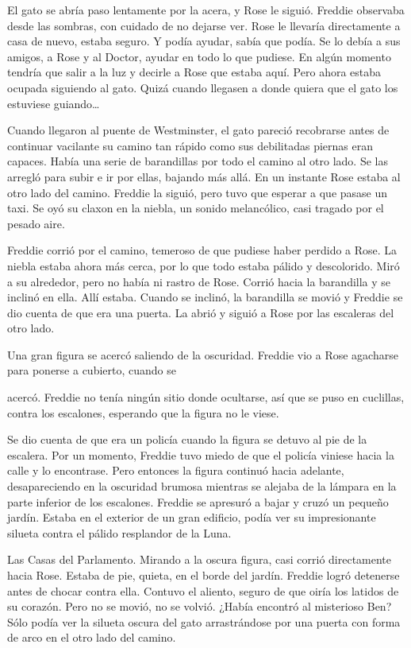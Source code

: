 \mbox{}

{El gato se abría paso lentamente por la acera, y Rose le siguió.
	Freddie observaba desde las sombras, con cuidado de no dejarse ver. Rose
	le llevaría directamente a casa de nuevo, estaba seguro. Y podía ayudar,
	sabía que podía. Se lo debía a sus amigos, a Rose y al Doctor, ayudar en
	todo lo que pudiese. En algún momento tendría que salir a la luz y
	decirle a Rose que estaba aquí. Pero ahora estaba ocupada siguiendo al
	gato. Quizá cuando llegasen a donde quiera que el gato los estuviese
	guiando\ldots{}}

{Cuando llegaron al puente de Westminster, el gato pareció recobrarse
	antes de continuar vacilante su camino tan rápido como sus debilitadas
	piernas eran capaces. Había una serie de barandillas por todo el camino
	al otro lado. Se las arregló para subir e ir por ellas, bajando más
	allá. En un instante Rose estaba al otro lado del camino. Freddie la
	siguió, pero tuvo que esperar a que pasase un taxi. Se oyó su claxon en
la niebla, un sonido melancólico, casi tragado por el pesado aire.}

{Freddie corrió por el camino, temeroso de que pudiese haber perdido a
	Rose. La niebla estaba ahora más cerca, por lo que todo estaba pálido y
	descolorido. Miró a su alrededor, pero no había ni rastro de Rose.
	Corrió hacia la barandilla y se inclinó en ella. Allí estaba. Cuando se
	inclinó, la barandilla se movió y Freddie se dio cuenta de que era una
puerta. La abrió y siguió a Rose por las escaleras del otro lado.}

{Una gran figura se acercó saliendo de la oscuridad. Freddie vio a Rose
agacharse para ponerse a cubierto, cuando se}

{acercó. Freddie no tenía ningún sitio donde ocultarse, así que se puso
	en cuclillas, contra los escalones, esperando que la figura no le
viese.}

{Se dio cuenta de que era un policía cuando la figura se detuvo al pie
	de la escalera. Por un momento, Freddie tuvo miedo de que el policía
	viniese hacia la calle y lo encontrase. Pero entonces la figura continuó
	hacia adelante, desapareciendo en la oscuridad brumosa mientras se
	alejaba de la lámpara en la parte inferior de los escalones. Freddie se
	apresuró a bajar y cruzó un pequeño jardín. Estaba en el exterior de un
	gran edificio, podía ver su impresionante silueta contra el pálido
resplandor de la Luna.}

{Las Casas del Parlamento. Mirando a la oscura figura, casi corrió
	directamente hacia Rose. Estaba de pie, quieta, en el borde del jardín.
	Freddie logró detenerse antes de chocar contra ella. Contuvo el aliento,
	seguro de que oiría los latidos de su corazón. Pero no se movió, no se
	volvió. ¿Había encontró al misterioso Ben? Sólo podía ver la silueta
	oscura del gato arrastrándose por una puerta con forma de arco en el
otro lado del camino.}

